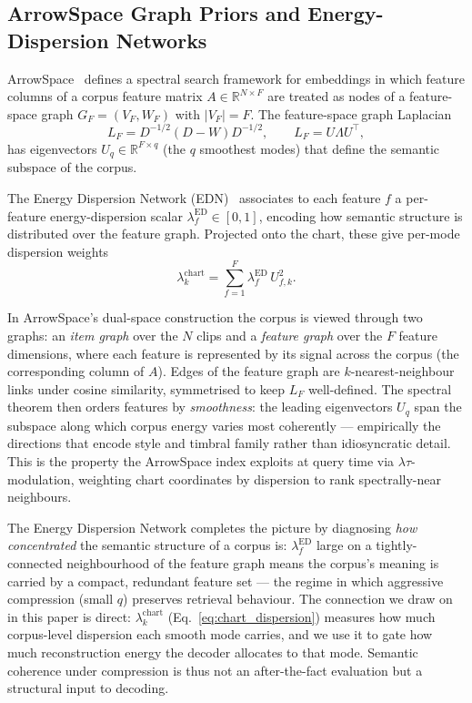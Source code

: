 \documentclass[12pt,a4paper]{article}
\begin{document}
\subsection{ArrowSpace Graph Priors and Energy-Dispersion Networks}
\label{subsec:bg_arrowspace}

ArrowSpace~\cite{arrowspace_joss} defines a spectral search framework for
embeddings in which feature columns of a corpus feature matrix
$A \in \mathbb{R}^{N \times F}$ are treated as nodes of a feature-space
graph $G_F = (V_F, W_F)$ with $|V_F|=F$. The feature-space graph
Laplacian
\begin{equation}
  L_F = D^{-1/2}(D - W)D^{-1/2}, \qquad L_F = U\Lambda U^\top,
  \label{eq:laplacian}
\end{equation}
has eigenvectors $U_q \in \mathbb{R}^{F \times q}$ (the $q$ smoothest
modes) that define the semantic subspace of the corpus.

The Energy Dispersion Network (EDN)~\cite{edn2025} associates to each
feature $f$ a per-feature energy-dispersion scalar
$\lambda^{\mathrm{ED}}_f \in [0,1]$, encoding how semantic structure is
distributed over the feature graph. Projected onto the chart, these give
per-mode dispersion weights
\begin{equation}
  \lambda^{\mathrm{chart}}_k
  = \sum_{f=1}^{F} \lambda^{\mathrm{ED}}_f \, U_{f,k}^2.
  \label{eq:chart_dispersion}
\end{equation}

In ArrowSpace's dual-space construction the corpus is viewed through two
graphs: an \emph{item graph} over the $N$ clips and a \emph{feature graph}
over the $F$ feature dimensions, where each feature is represented by its
signal across the corpus (the corresponding column of $A$). Edges of the
feature graph are $k$-nearest-neighbour links under cosine similarity,
symmetrised to keep $L_F$ well-defined. The spectral theorem then
orders features by \emph{smoothness}: the leading eigenvectors $U_q$
span the subspace along which corpus energy varies most coherently —
empirically the directions that encode style and timbral family rather
than idiosyncratic detail. This is the property the ArrowSpace index
exploits at query time via $\lambda\tau$-modulation, weighting chart
coordinates by dispersion to rank spectrally-near neighbours.

The Energy Dispersion Network completes the picture by diagnosing
\emph{how concentrated} the semantic structure of a corpus is:
$\lambda^{\mathrm{ED}}_f$ large on a tightly-connected neighbourhood of
the feature graph means the corpus's meaning is carried by a compact,
redundant feature set — the regime in which aggressive compression (small
$q$) preserves retrieval behaviour. The connection we draw on in this
paper is direct: $\lambda^{\mathrm{chart}}_k$ (Eq.~\ref{eq:chart_dispersion})
measures how much corpus-level dispersion each smooth mode carries, and
we use it to gate how much reconstruction energy the decoder allocates to
that mode. Semantic coherence under compression is thus not an
after-the-fact evaluation but a structural input to decoding.
\end{document}

